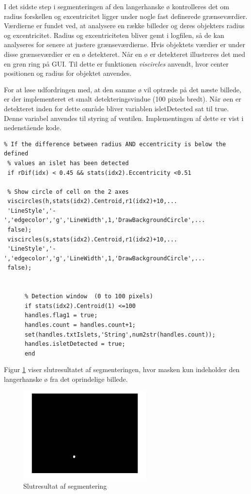 \newpage
I det sidste step i segmenteringen af den langerhanske ø kontrolleres det om radius forskellen og excentricitet ligger under nogle fast definerede grænseværdier. Værdierne er fundet ved, at analysere en række billeder og deres objekters radius og excentricitet. Radius og excentriciteten bliver gemt i logfilen, så de kan analyseres for senere at justere grænseværdierne. Hvis objektets værdier er under disse grænseværdier er en ø detekteret. Når en ø er detekteret illustreres det med en grøn ring på GUI. Til dette er funktionen \textit{viscircles} anvendt, hvor center positionen og radius for objektet anvendes. 

For at løse udfordringen med, at den samme ø vil optræde på det næste billede, er der implementeret et smalt detekteringsvindue (100 pixels bredt). Når øen er detekteret inden for dette område bliver variablen isletDetected sat til true. Denne variabel anvendes til styring af ventilen. Implementingen af dette er vist i nedenstående kode.


\begin{lstlisting} 
% If the difference between radius AND eccentricity is below the defined
 % values an islet has been detected
 if rDif(idx) < 0.45 && stats(idx2).Eccentricity <0.51
     
 % Show circle of cell on the 2 axes
 viscircles(h,stats(idx2).Centroid,r1(idx2)+10,...
 'LineStyle','-','edgecolor','g','LineWidth',1,'DrawBackgroundCircle',...
 false);
 viscircles(s,stats(idx2).Centroid,r1(idx2)+10,...
 'LineStyle','-','edgecolor','g','LineWidth',1,'DrawBackgroundCircle',...
 false);

     
      % Detection window  (0 to 100 pixels)
      if stats(idx2).Centroid(1) <=100 
      handles.flag1 = true;
      handles.count = handles.count+1; 
      set(handles.txtIslets,'String',num2str(handles.count));
      handles.isletDetected = true;
      end
\end{lstlisting} 

Figur \ref{fig:segmented} viser slutresultatet af segmenteringen, hvor masken kun indeholder den langerhanske ø fra det oprindelige billede. 


\begin{figure}[H]
	\centering
	\includegraphics[width=0.6\textwidth]{billeder/software/segmented.png}
	\caption{Slutresultat af segmentering}
	\label{fig:segmented}
\end{figure}

